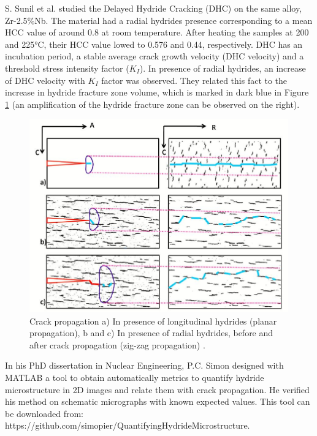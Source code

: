 \noindent
S. Sunil et al. \cite{SUNIL2020152457} studied the Delayed Hydride Cracking (DHC) on the same alloy, Zr-2.5\%Nb. The material had a radial hydrides presence corresponding to a mean HCC value of around 0.8 at room temperature. After heating the samples at 200 and 225°C, their HCC value lowed to 0.576 and 0.44, respectively. DHC has an incubation period, a stable average crack growth velocity (DHC velocity) and a threshold stress intensity factor ($K_I$). In presence of radial hydrides, an increase of DHC velocity with $K_I$ factor was observed. They related this fact to the increase in hydride fracture zone volume, which is marked in dark blue in Figure \ref{fig:ref3} (an amplification of the hydride fracture zone can be observed on the right).

\begin{figure}[h] %
    \centering
    \includegraphics[width=4.4in]{Figures/4-Lit. Review/propagation.JPG}
    \caption{Crack propagation a) In presence of longitudinal hydrides (planar propagation), b and c) In presence of radial hydrides, before and after crack propagation (zig-zag propagation)  \cite{SUNIL2020152457}.}
    \label{fig:ref3}
\end{figure}


\noindent
In his PhD dissertation in Nuclear Engineering, P.C. Simon \cite{thesis} designed with MATLAB a tool to obtain automatically metrics to quantify hydride microstructure in 2D images and relate them with crack propagation. He verified  his method on schematic micrographs with known expected values. This tool can be downloaded from: https://github.com/simopier/QuantifyingHydrideMicrostructure. 

\cite{COLAS2013586}

\cite{SUNIL2020152457}